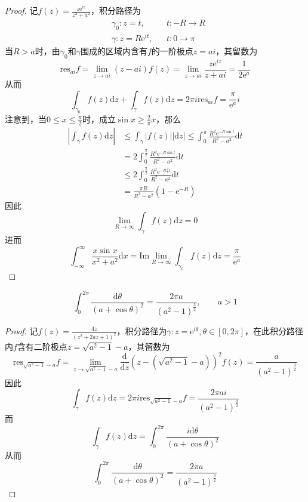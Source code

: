 \documentclass[lang = cn, scheme = chinese, thmcnt = section]{elegantbook}
\begin{document}
\begin{proof}
	记$f(z)=\frac{z\mathrm{e}^{iz}}{z^2+a^2}$，积分路径为
	\begin{align*}
		& \gamma_0:z=t,&& t:-R\to R\\
		& \gamma:z=R\mathrm{e}^{it},&& t:0\to\pi
	\end{align*}
	当$R>a$时，由$\gamma_0$和$\gamma$围成的区域内含有$f$的一阶极点$z=ai$​，其留数为
	$$
	\mathrm{res}_{ai}f=\lim_{z\to ai}(z-ai)f(z)=\lim_{z\to ai}\frac{z\mathrm{e}^{iz}}{z+ai}=\frac{1}{2\mathrm{e}^{a}}
	$$
	从而
	$$
	\int_{\gamma_0}f(z)\mathrm{d}z+\int_{\gamma}f(z)\mathrm{d}z=2\pi i \mathrm{res}_{ai}f=\frac{\pi }{\mathrm{e}^a}i
	$$
	注意到，当$0\le x\le \frac{\pi }{2}$时，成立$\sin x\ge \frac{2}{\pi }x$​，那么
	\begin{align*}
		\left| \int_{\gamma}{f(z)\mathrm{d}z} \right|
		& \le\int_\gamma{|f(z)||\mathrm{d}z|}
		\le\int_0^\pi \frac{R^2\mathrm{e}^{-R\sin t}}{R^2-a^2}\mathrm{d}t\\
		& =2\int_0^\frac{\pi}{2} \frac{R^2\mathrm{e}^{-R\sin t}}{R^2-a^2}\mathrm{d}t\\
		& \le
		2\int_0^\frac{\pi}{2} \frac{R^2\mathrm{e}^{-R\frac{2}{\pi}t}}{R^2-a^2}\mathrm{d}t\\
		& =\frac{\pi R}{R^2-a^2}(1-\mathrm{e}^{-R})
	\end{align*}
	因此
	$$
	\lim_{R\to\infty}\int_{\gamma}f(z)\mathrm{d}z=0
	$$
	进而
	$$
	\int_{-\infty}^{\infty}\frac{x\sin x}{x^2+a^2}\mathrm{d}x=\text{Im}\lim_{R\to\infty}\int_{\gamma_0}f(z)\mathrm{d}z=\frac{\pi}{\mathrm{e}^a}
	$$
\end{proof}

\begin{example}
	$$
	\int_0^{2\pi}\frac{\mathrm{d}\theta}{(a+\cos\theta)^2}=\frac{2\pi a}{(a^2-1)^{\frac{3}{2}}},\qquad a>1
	$$
\end{example}

\begin{proof}
	记$f(z)=\frac{4z}{(z^2+2az+1)^2}$，积分路径为$\gamma:z=\mathrm{e}^{i\theta},\theta\in[0,2\pi]$，在此积分路径内$f$含有二阶极点$z=\sqrt{a^2-1}-a$​，其留数为
	$$
	\mathrm{res}_{\sqrt{a^2-1}-a}f=\lim_{z\to \sqrt{a^2-1}-a}\frac{\mathrm{d}}{\mathrm{d}z}(z-(\sqrt{a^2-1}-a))^2f(z)=\frac{a}{(a^2-1)^{\frac{3}{2}}}
	$$
	因此
	$$
	\int_{\gamma}f(z)\mathrm{d}z=2\pi i\mathrm{res}_{\sqrt{a^2-1}-a}f=\frac{2\pi ai}{(a^2-1)^{\frac{3}{2}}}
	$$
	而
	$$
	\int_{\gamma}f(z)\mathrm{d}z=\int_0^{2\pi}\frac{i\mathrm{d}\theta}{(a+\cos\theta)^2}
	$$
	从而
	$$
	\int_0^{2\pi}\frac{\mathrm{d}\theta}{(a+\cos\theta)^2}=\frac{2\pi a}{(a^2-1)^{\frac{3}{2}}}
	$$
\end{proof}
\end{document}
